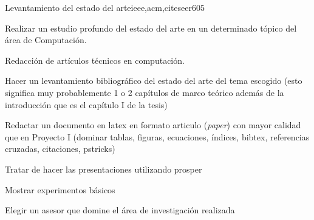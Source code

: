 \begin{syllabus}
\begin{unit}{Levantamiento del estado del arte}{ieee,acm,citeseer}{60}{5}
  \begin{topics}
      \item Realizar un estudio profundo del estado del arte en un determinado tópico del área de Computación.
      \item Redacción de artículos técnicos en computación.
  \end{topics}
  \begin{learningoutcomes}
      \item Hacer un levantamiento bibliográfico del estado del arte del tema escogido (esto significa muy probablemente 1 o 2 capítulos de marco teórico además de la introducción que es el capítulo I de la tesis)
      \item Redactar un documento en latex en formato articulo (\emph{paper}) con mayor calidad que en Proyecto I (dominar tablas, figuras, ecuaciones, índices, bibtex, referencias cruzadas, citaciones, pstricks)
      \item Tratar de hacer las presentaciones utilizando prosper
      \item Mostrar experimentos básicos
      \item Elegir un asesor que domine el área de investigación realizada
   \end{learningoutcomes}
\end{unit}



\begin{coursebibliography}

\end{coursebibliography}
\end{syllabus}
